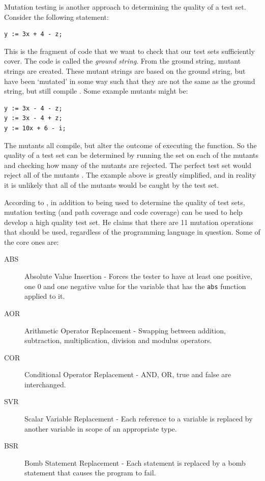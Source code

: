 Mutation testing is another approach to determining the quality of a test set. Consider the following statement:

\begin{lstlisting}
y := 3x + 4 - z;
\end{lstlisting}

This is the fragment of code that we want to check that our test sets sufficiently cover. The code is called the \emph{ground string}. From the ground string, mutant strings are created. These mutant strings are based on the ground string, but have been `mutated' in some way such that they are not the same as the ground string, but still compile \citep{softwareTestingIntro}. Some example mutants might be:

\begin{lstlisting}
y := 3x - 4 - z;
y := 3x - 4 + z;
y := 10x + 6 - i;
\end{lstlisting}

The mutants all compile, but alter the outcome of executing the function. So the quality of a test set can be determined by running the set on each of the mutants and checking how many of the mutants are rejected. The perfect test set would reject all of the mutants \citep{softwareTestingIntro}. The example above is greatly simplified, and in reality it is unlikely that all of the mutants would be caught by the test set.

According to \citet{softwareTestingIntro}, in addition to being used to determine the quality of test sets, mutation testing (and path coverage and code coverage) can be used to help develop a high quality test set. He claims that there are 11 mutation operations that should be used, regardless of the programming language in question. Some of the core ones are:

\begin{description}
\item[ABS] Absolute Value Insertion - Forces the tester to have at least one positive, one 0 and one negative value for the variable that has the \verb+abs+ function applied to it.
\item[AOR] Arithmetic Operator Replacement - Swapping between addition, subtraction, multiplication, division and modulus operators.
\item[COR] Conditional Operator Replacement - AND, OR, true and false are interchanged.
\item[SVR] Scalar Variable Replacement - Each reference to a variable is replaced by another variable in scope of an appropriate type.
\item[BSR] Bomb Statement Replacement - Each statement is replaced by a bomb statement that causes the program to fail.
\end{description}

